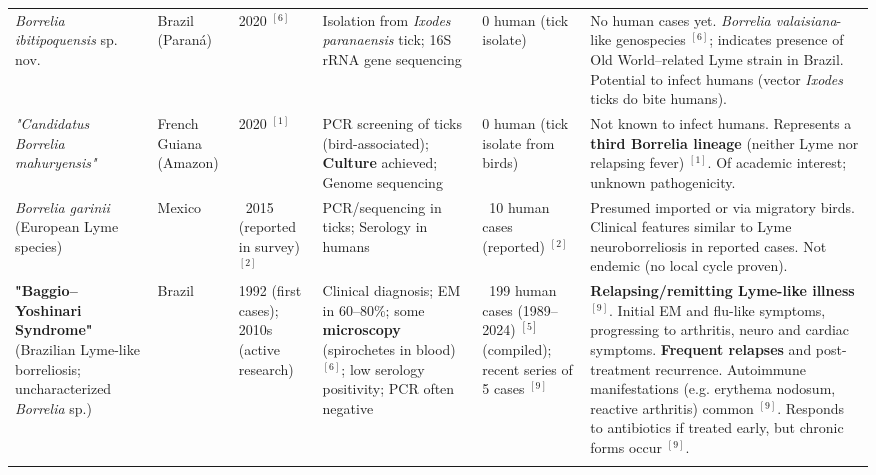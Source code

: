 \documentclass[11pt,letterpaper]{article}
\newcommand{\mycite}[1]{$^{[#1]}$}
\begin{document}
\begin{table}[H]
\begin{tabular}{@{}p{2.8cm}p{1.5cm}p{1.5cm}p{2.8cm}p{1.8cm}p{4.2cm}@{}}
\textit{Borrelia ibitipoquensis} sp. nov. & Brazil (Paraná) & 2020 \mycite{6} & Isolation from \textit{Ixodes paranaensis} tick; 16S rRNA gene sequencing & 0 human (tick isolate) & No human cases yet. \textit{Borrelia valaisiana}-like genospecies \mycite{6}; indicates presence of Old World–related Lyme strain in Brazil. Potential to infect humans (vector \textit{Ixodes} ticks do bite humans). \\
\addlinespace[4pt]

\textit{"Candidatus Borrelia mahuryensis"} & French Guiana (Amazon) & 2020 \mycite{1} & PCR screening of ticks (bird-associated); \textbf{Culture} achieved; Genome sequencing & 0 human (tick isolate from birds) & Not known to infect humans. Represents a \textbf{third Borrelia lineage} (neither Lyme nor relapsing fever) \mycite{1}. Of academic interest; unknown pathogenicity. \\
\addlinespace[4pt]

\textit{Borrelia garinii} (European Lyme species) & Mexico & ~2015 (reported in survey) \mycite{2} & PCR/sequencing in ticks; Serology in humans & ~10 human cases (reported) \mycite{2} & Presumed imported or via migratory birds. Clinical features similar to Lyme neuroborreliosis in reported cases. Not endemic (no local cycle proven). \\
\addlinespace[6pt]

\textbf{"Baggio–Yoshinari Syndrome"} (Brazilian Lyme-like borreliosis; uncharacterized \textit{Borrelia} sp.) & Brazil & 1992 (first cases); 2010s (active research) & Clinical diagnosis; EM in 60–80\%; some \textbf{microscopy} (spirochetes in blood) \mycite{6}; low serology positivity; PCR often negative & ~199 human cases (1989–2024) \mycite{5} (compiled); recent series of 5 cases \mycite{9} & \textbf{Relapsing/remitting Lyme-like illness} \mycite{9}. Initial EM and flu-like symptoms, progressing to arthritis, neuro and cardiac symptoms. \textbf{Frequent relapses} and post-treatment recurrence. Autoimmune manifestations (e.g. erythema nodosum, reactive arthritis) common \mycite{9}. Responds to antibiotics if treated early, but chronic forms occur \mycite{9}. \\
\addlinespace[4pt]


\end{tabular}
\end{table}
\end{document}
